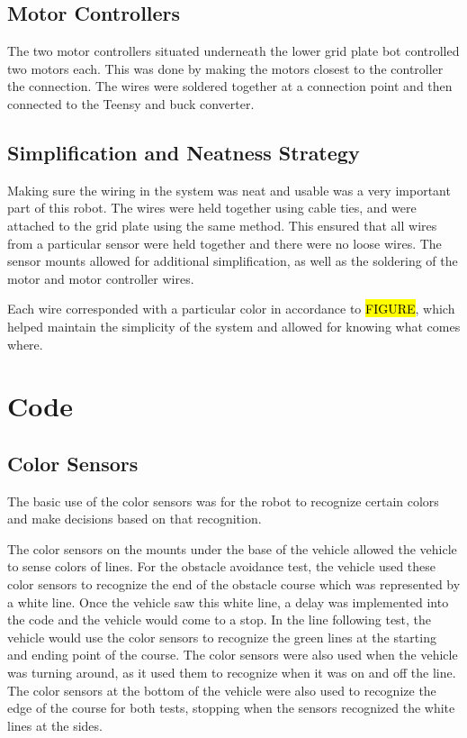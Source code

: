 \documentclass[11pt]{report}
\begin{document}
\subsection{Motor Controllers}
The two motor controllers situated underneath the lower grid plate bot controlled two motors each. This was done by making the motors closest to the controller the connection. The wires were soldered together at a connection point and then connected to the Teensy and buck converter. 
\subsection{Simplification and Neatness Strategy}
Making sure the wiring in the system was neat and usable was a very important part of this robot. The wires were held together using cable ties, and were attached to the grid plate using the same method. This ensured that all wires from a particular sensor were held together and there were no loose wires. The sensor mounts allowed for additional simplification, as well as the soldering of the motor and motor controller wires. 
\par Each wire corresponded with a particular color in accordance to \hl{FIGURE}, which helped maintain the simplicity of the system and allowed for knowing what comes where. 
\section{Code}
\subsection{Color Sensors}
The basic use of the color sensors was for the robot to recognize certain colors and make decisions based on that recognition. 

\par The color sensors on the mounts under the base of the vehicle allowed the vehicle to sense colors of lines. For the obstacle avoidance test, the vehicle used these color sensors to recognize the end of the obstacle course which was represented by a white line. Once the vehicle saw this white line, a delay was implemented into the code and the vehicle would come to a stop. In the line following test, the vehicle would use the color sensors to recognize the green lines at the starting and ending point of the course. The color sensors were also used when the vehicle was turning around, as it used them to recognize when it was on and off the line. The color sensors at the bottom of the vehicle were also used to recognize the edge of the course for both tests, stopping when the sensors recognized the white lines at the sides.
\end{document}
